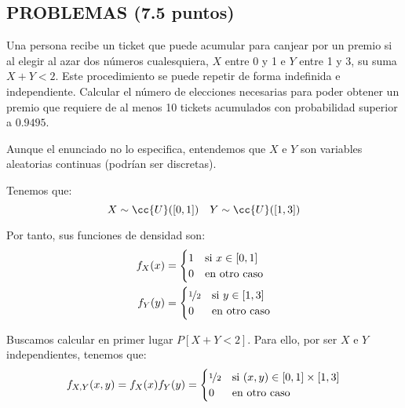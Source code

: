 \documentclass[12pt]{article}
\begin{document}
    \subsection*{PROBLEMAS (7.5 puntos)}
    \begin{ejercicio}
        Una persona recibe un ticket que puede acumular para canjear por un premio si al elegir al azar dos números cualesquiera, $X$ entre 0 y 1 e $Y$ entre 1 y 3, su suma $X+Y<2$. Este procedimiento se puede repetir de forma indefinida e independiente. Calcular el número de elecciones necesarias para poder obtener un premio que requiere de al menos 10 tickets acumulados con probabilidad superior a $0.9495$.
        \begin{observacion}
            Aunque el enunciado no lo especifica, entendemos que $X$ e $Y$ son variables aleatorias continuas (podrían ser discretas).
        \end{observacion}

        Tenemos que:
        \begin{equation*}
            X\sim \cc{U}([0,1])\quad Y\sim \cc{U}([1,3])
        \end{equation*}

        Por tanto, sus funciones de densidad son:
        \begin{align*}
            f_X(x) &= \begin{cases}
                1 & \text{si } x\in [0,1] \\
                0 & \text{en otro caso}
            \end{cases} \\
            f_Y(y) &= \begin{cases}
                \nicefrac{1}{2} & \text{si } y\in [1,3] \\
                0 & \text{en otro caso}
            \end{cases}
        \end{align*}

        Buscamos calcular en primer lugar $P[X+Y<2]$. Para ello, por ser $X$ e $Y$ independientes, tenemos que:
        \begin{equation*}
            f_{X,Y}(x,y) = f_X(x)f_Y(y) = \begin{cases}
                \nicefrac{1}{2} & \text{si } (x,y)\in [0,1]\times [1,3] \\
                0 & \text{en otro caso}
            \end{cases}
        \end{equation*}


\end{ejercicio}
\end{document}
